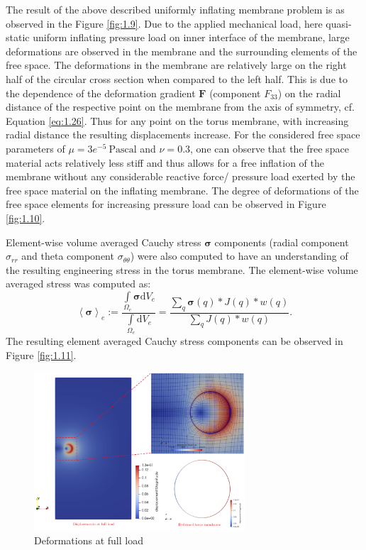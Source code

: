 \documentclass[11pt,a4paper,final]{article}
\begin{document}
The result of the above described uniformly inflating membrane problem is as observed in the Figure \eqref{fig:1.9}. Due to the applied mechanical load, here quasi-static uniform inflating pressure load on inner interface of the membrane, large deformations are observed in the membrane and the surrounding elements of the free space. The deformations in the membrane are relatively large on the right half of the circular cross section when compared to the left half. This is due to the dependence of the deformation gradient $\mathbf{F}$ (component $F_{33}$) on the radial distance of the respective point on the membrane from the axis of symmetry, cf. Equation \eqref{eq:1.26}. Thus for any point on the torus membrane, with increasing radial distance the resulting displacements increase. For the considered free space parameters of $\mu = 3e^{-5} \ \text{Pascal}$ and $\nu = 0.3$, one can observe that the free space material acts relatively less stiff and thus allows for a free inflation of the membrane without any considerable reactive force/ pressure load exerted by the free space material on the inflating membrane. The degree of deformations of the free space elements for increasing pressure load can be observed in Figure \eqref{fig:1.10}. \par 

Element-wise volume averaged Cauchy stress $\bm{\sigma}$ components (radial component $\sigma_{rr}$ and theta component $\sigma_{\theta \theta}$) were also computed to have an understanding of the resulting engineering stress in the torus membrane. The element-wise volume averaged stress was computed as:
\begin{equation}
\left\langle \bm{\sigma} \right\rangle_e := \dfrac{\int\limits_{\Omega_{e}} \bm{\sigma} \mathrm{d}V_e}{\int\limits_{\Omega_{e}} \mathrm{d}V_e} = \dfrac{\sum\limits_{q} \bm{\sigma}(q) * J(q) * w(q)}{\sum\limits_{q} J(q) * w(q)}.
\end{equation}  
The resulting element averaged Cauchy stress components can be observed in Figure \eqref{fig:1.11}. 

\begin{figure}[h]
\centering
\includegraphics[width=0.7\textwidth]{torus_disp_mue_1000_2.png}
\caption{Deformations at full load}
\label{fig:1.9}
\end{figure}
\end{document}
